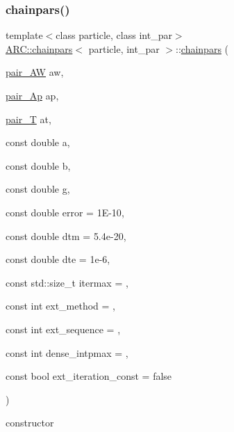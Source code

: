 \subsubsection{\texorpdfstring{chainpars()}{chainpars()}\hspace{0.1cm}{\footnotesize\ttfamily [2/2]}}
{\footnotesize\ttfamily template$<$class particle, class int\+\_\+par$>$ \\
\hyperlink{classARC_1_1chainpars}{A\+R\+C\+::chainpars}$<$ particle, int\+\_\+par $>$\+::\hyperlink{classARC_1_1chainpars}{chainpars} (\begin{DoxyParamCaption}\item[{\hyperlink{classARC_1_1chainpars_a766866c2e38b475767a4f8529624a378}{pair\+\_\+\+AW}}]{aw,  }\item[{\hyperlink{classARC_1_1chainpars_aa34d083090c50f572d2126262e169474}{pair\+\_\+\+Ap}}]{ap,  }\item[{\hyperlink{classARC_1_1chainpars_a343fccd377d7215a4af2e909f3f9acf6}{pair\+\_\+T}}]{at,  }\item[{const double}]{a,  }\item[{const double}]{b,  }\item[{const double}]{g,  }\item[{const double}]{error = {\ttfamily 1E-\/10},  }\item[{const double}]{dtm = {\ttfamily 5.4e-\/20},  }\item[{const double}]{dte = {\ttfamily 1e-\/6},  }\item[{const std\+::size\+\_\+t}]{itermax = {},  }\item[{const int}]{ext\+\_\+method = {},  }\item[{const int}]{ext\+\_\+sequence = {},  }\item[{const int}]{dense\+\_\+intpmax = {},  }\item[{const bool}]{ext\+\_\+iteration\+\_\+const = {\ttfamily false} }\end{DoxyParamCaption})\hspace{0.3cm}{\ttfamily [inline]}}



constructor 


